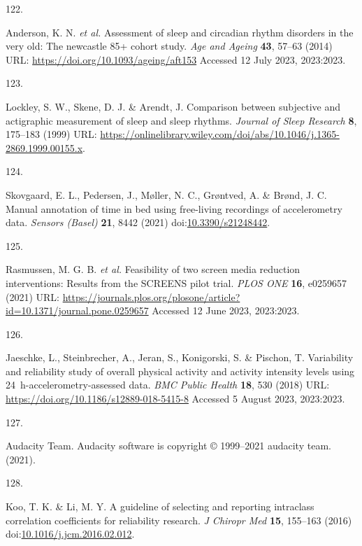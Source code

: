 \documentclass[
  10pt,
]{scrbook}
\newlength{\cslhangindent}
\newlength{\csllabelwidth}
\newlength{\cslentryspacingunit} %
\newenvironment{CSLReferences}[2] %
 {%
  \setlength{\parindent}{0pt}
  \ifodd #1
  \let\oldpar\par
  \def\par{\hangindent=\cslhangindent\oldpar}
  \fi
  \setlength{\parskip}{#2\cslentryspacingunit}
 }%
 {}
\newcommand{\CSLLeftMargin}[1]{\parbox[t]{\csllabelwidth}{#1}}
\newcommand{\CSLRightInline}[1]{\parbox[t]{\linewidth - \csllabelwidth}{#1}\break}
\begin{document}
\begin{CSLReferences}{0}{0}
\leavevmode{}%
\CSLLeftMargin{122. }%
\CSLRightInline{Anderson, K. N. \emph{et al.} Assessment of sleep and
circadian rhythm disorders in the very old: The newcastle 85+ cohort
study. \emph{Age and Ageing} \textbf{43}, 57--63 (2014) URL:
\url{https://doi.org/10.1093/ageing/aft153} Accessed 12 July 2023,
2023:2023.}

\leavevmode{}%
\CSLLeftMargin{123. }%
\CSLRightInline{Lockley, S. W., Skene, D. J. \& Arendt, J. Comparison
between subjective and actigraphic measurement of sleep and sleep
rhythms. \emph{Journal of Sleep Research} \textbf{8}, 175--183 (1999)
URL:
\url{https://onlinelibrary.wiley.com/doi/abs/10.1046/j.1365-2869.1999.00155.x}.}

\leavevmode{}%
\CSLLeftMargin{124. }%
\CSLRightInline{Skovgaard, E. L., Pedersen, J., Møller, N. C., Grøntved,
A. \& Brønd, J. C. Manual annotation of time in bed using free-living
recordings of accelerometry data. \emph{Sensors (Basel)} \textbf{21},
8442 (2021)
doi:\href{https://doi.org/10.3390/s21248442}{10.3390/s21248442}.}

\leavevmode{}%
\CSLLeftMargin{125. }%
\CSLRightInline{Rasmussen, M. G. B. \emph{et al.} Feasibility of two
screen media reduction interventions: Results from the {SCREENS} pilot
trial. \emph{{PLOS} {ONE}} \textbf{16}, e0259657 (2021) URL:
\url{https://journals.plos.org/plosone/article?id=10.1371/journal.pone.0259657}
Accessed 12 June 2023, 2023:2023.}

\leavevmode{}%
\CSLLeftMargin{126. }%
\CSLRightInline{Jaeschke, L., Steinbrecher, A., Jeran, S., Konigorski,
S. \& Pischon, T. Variability and reliability study of overall physical
activity and activity intensity levels using 24~h-accelerometry-assessed
data. \emph{{BMC} Public Health} \textbf{18}, 530 (2018) URL:
\url{https://doi.org/10.1186/s12889-018-5415-8} Accessed 5 August 2023,
2023:2023.}

\leavevmode{}%
\CSLLeftMargin{127. }%
\CSLRightInline{Audacity Team. Audacity\textregistered{} software is
copyright © 1999--2021 audacity team. (2021).}

\leavevmode{}%
\CSLLeftMargin{128. }%
\CSLRightInline{Koo, T. K. \& Li, M. Y. A guideline of selecting and
reporting intraclass correlation coefficients for reliability research.
\emph{J Chiropr Med} \textbf{15}, 155--163 (2016)
doi:\href{https://doi.org/10.1016/j.jcm.2016.02.012}{10.1016/j.jcm.2016.02.012}.}


\end{CSLReferences}
\end{document}
